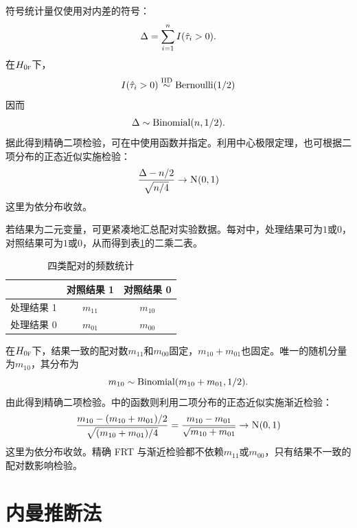  
 
  \begin{example}
 [符号统计量]\label{eg::mpe-sign}
 符号统计量仅使用对内差的符号：
$$
 \Delta = \sum_{i=1}^n I( \hat{\tau}_i > 0 ).
 $$
 在$H_{0\textsc{f}}$下，
$$
 I( \hat{\tau}_i > 0 ) \stackrel{\textup{IID}}{\sim} \textup{Bernoulli}(1/2)
 $$
因而
$$
  \Delta \sim \textup{Binomial}(n, 1/2).
 $$
据此得到精确二项检验，可在中使用函数并指定。利用中心极限定理，也可根据二项分布的正态近似实施检验：
$$
\frac{  \Delta - n/2 }{  \sqrt{n/4} } \rightarrow \N01 
$$
这里为依分布收敛。 
 \end{example}
 
 
 
 \begin{example}
 [二元结果下的麦克尼马尔检验]\label{eg::mcnenar-test-binary}
 若结果为二元变量，可更紧凑地汇总配对实验数据。每对中，处理结果可为$1$或$0$，对照结果可为$1$或$0$，从而得到表\ref{tb::binarymatchedpairs}的二乘二表。 
 
\begin{table}
\centering
\caption{四类配对的频数统计}\label{tb::binarymatchedpairs}
\begin{tabular}{ccc}
\hline 
 & 对照结果 1 & 对照结果 0\\
 \hline 
处理结果 1 & $m_{11}$ & $m_{10}$ \\
处理结果 0 & $m_{01}$ & $m_{00}$ \\
\hline 
\end{tabular}
\end{table} 
 
在$H_{0\textsc{f}}$下，结果一致的配对数$m_{11}$和$m_{00}$固定，$m_{10} + m_{01}$也固定。唯一的随机分量为$m_{10}$，其分布为
$$
m_{10} \sim \textup{Binomial}( m_{10} + m_{01}, 1/2  ).
$$
由此得到精确二项检验。中的函数则利用二项分布的正态近似实施渐近检验：
$$
\frac{   m_{10}  - (m_{10} + m_{01})/2  }{  \sqrt{  (m_{10} + m_{01}) / 4   } } 
= \frac{ m_{10}  -  m_{01}   }{  \sqrt{ m_{10} + m_{01}    }  }
\rightarrow \N01  
$$
这里为依分布收敛。精确 FRT 与渐近检验都不依赖$m_{11}$或$m_{00}$，只有结果不一致的配对数影响检验。 
 \end{example}
 
 
 
\section{内曼推断法}
 
